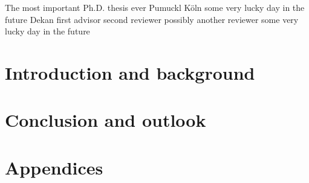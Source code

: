 \documentclass[a4paper,12pt,oneside]{book}
\begin{document}
\frontmatter

\ThesisTitle
    {The most important Ph.D. thesis ever} %
    {Pumuckl}               %
    {Köln}                              %
    {some very lucky day in the future}                  %
    {Dekan}									%
    {first advisor}                %
    {second reviewer}            %
    {possibly another reviewer}						%
    {some very lucky day in the future}                  %




\pagestyle{empty}

\clearpage

\clearpage

\clearpage


\clearpage


\pagestyle{fancyplain} %
\tableofcontents
{}



\mainmatter\setcounter{page}{1}

\part{Introduction and background}





\part{Conclusion and outlook}



\cleardoublepage
{}
\listoffigures
{}
 
\cleardoublepage
\listoftables
{}


\backmatter
\newpage


\markboth{}{}


\clearpage
\appendix
\part*{Appendices}
\renewcommand{\thesection}{\Alph{section}}


\end{document}
